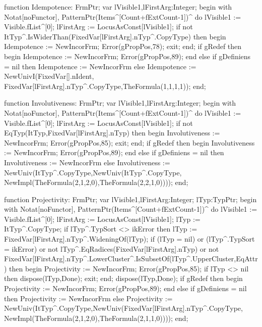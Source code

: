    function Idempotence: FrmPtr;
   var lVisible1,lFirstArg:Integer;
   begin
      with Notat[noFunctor], PatternPtr(Items^[Count+fExtCount-1])^ do
                                lVisible1 := Visible.fList^[0];
      lFirstArg := LocusAsConst[lVisible1];
      if not ItTyp^.IsWiderThan(FixedVar[lFirstArg].nTyp^.CopyType) then
      begin
         Idempotence := NewIncorFrm;
         Error(gPropPos,78);
         exit;
      end;
      if gRedef then
      begin
         Idempotence := NewIncorFrm;
         Error(gPropPos,89);
      end
      else
         if gDefiniens = nil then Idempotence := NewIncorFrm
         else
            Idempotence := NewUnivI(FixedVar[].nIdent,
                                    FixedVar[lFirstArg].nTyp^.CopyType,TheFormula(1,1,1,1));
   end;
   
   function Involutiveness: FrmPtr;
   var lVisible1,lFirstArg:Integer;
   begin
      with Notat[noFunctor], PatternPtr(Items^[Count+fExtCount-1])^ do
                                lVisible1 := Visible.fList^[0];
      lFirstArg := LocusAsConst[lVisible1];
      if not EqTyp(ItTyp,FixedVar[lFirstArg].nTyp) then
      begin
         Involutiveness := NewIncorFrm;
         Error(gPropPos,85);
         exit;
      end;
      if gRedef then
      begin
         Involutiveness := NewIncorFrm;
         Error(gPropPos,89);
      end
      else
         if gDefiniens = nil then Involutiveness := NewIncorFrm
         else
            Involutiveness := NewUniv(ItTyp^.CopyType,NewUniv(ItTyp^.CopyType,
                                                              NewImpl(TheFormula(2,1,2,0),TheFormula(2,2,1,0))));
   end;
   
   function Projectivity: FrmPtr;
   var lVisible1,lFirstArg:Integer;
   lTyp:TypPtr;
   begin
      with Notat[noFunctor], PatternPtr(Items^[Count+fExtCount-1])^ do
                                lVisible1 := Visible.fList^[0];
      lFirstArg := LocusAsConst[lVisible1];
      lTyp := ItTyp^.CopyType;
      if lTyp^.TypSort <> ikError then
         lTyp := FixedVar[lFirstArg].nTyp^.WideningOf(lTyp);
      if (lTyp = nil) or (lTyp^.TypSort = ikError) or
            not lTyp^.EqRadices(FixedVar[lFirstArg].nTyp) or
            not FixedVar[lFirstArg].nTyp^.LowerCluster^.IsSubsetOf(lTyp^.UpperCluster,EqAttr)
      then
      begin
         Projectivity := NewIncorFrm;
         Error(gPropPos,85);
         if lTyp <> nil then dispose(lTyp,Done);
         exit;
      end;
      dispose(lTyp,Done);
      if gRedef then
      begin
         Projectivity := NewIncorFrm;
         Error(gPropPos,89);
      end
      else
         if gDefiniens = nil then Projectivity := NewIncorFrm
         else
            Projectivity := NewUniv(ItTyp^.CopyType,NewUniv(FixedVar[lFirstArg].nTyp^.CopyType,
                                                            NewImpl(TheFormula(2,1,2,0),TheFormula(2,1,1,0))));
   end;
   
